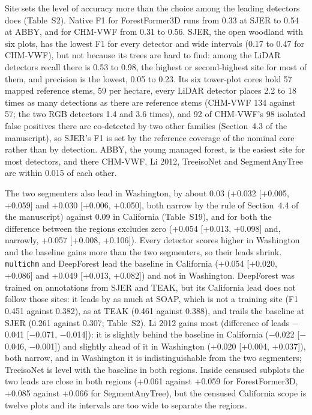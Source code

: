 \documentclass[10pt,a4paper]{article}
\begin{document}
Site sets the level of accuracy more than the choice among the leading detectors
does (Table~S2). Native F1 for ForestFormer3D runs from 0.33 at SJER to 0.54 at
ABBY, and for CHM-VWF from 0.31 to 0.56. SJER, the open woodland with six plots,
has the lowest F1 for every detector and wide intervals (0.17 to 0.47 for
CHM-VWF), but not because its trees are hard to find: among the LiDAR detectors
recall there is 0.53 to 0.98, the highest or second-highest site for most of
them, and precision is the lowest, 0.05 to 0.23. Its six tower-plot cores hold
57 mapped reference stems, 59 per hectare, every LiDAR detector places 2.2 to 18
times as many detections as there are reference stems (CHM-VWF 134 against 57;
the two RGB detectors 1.4 and 3.6 times), and 92 of CHM-VWF's 98 isolated false
positives there are co-detected by two other families (Section~4.3 of the
manuscript), so SJER's F1 is set by the reference coverage of the nominal core
rather than by detection. ABBY, the young managed forest, is the easiest site
for most detectors, and there CHM-VWF, Li 2012, TreeisoNet and SegmentAnyTree
are within 0.015 of each other.

The two segmenters also lead in Washington, by about 0.03 (+0.032 [+0.005,
+0.059] and +0.030 [+0.006, +0.050], both narrow by the rule of Section~4.4 of
the manuscript) against 0.09 in California (Table~S19), and for both the
difference between the regions excludes zero (+0.054 [+0.013, +0.098] and,
narrowly, +0.057 [+0.008, +0.106]). Every detector scores higher in Washington
and the baseline gains more than the two segmenters, so their leads shrink.
\texttt{multichm} and DeepForest lead the baseline in California (+0.054 [+0.020,
+0.086] and +0.049 [+0.013, +0.082]) and not in Washington. DeepForest was
trained on annotations from SJER and TEAK, but its California lead does not
follow those sites: it leads by as much at SOAP, which is not a training site
(F1 0.451 against 0.382), as at TEAK (0.461 against 0.388), and trails the
baseline at SJER (0.261 against 0.307; Table~S2). Li 2012 gains most (difference
of leads $-$0.041 [$-$0.071, $-$0.014]): it is slightly behind the baseline in
California ($-$0.022 [$-$0.046, $-$0.001]) and slightly ahead of it in Washington
(+0.020 [+0.004, +0.037]), both narrow, and in Washington it is
indistinguishable from the two segmenters; TreeisoNet is level with the baseline
in both regions. Inside censused subplots the two leads are close in both
regions (+0.061 against +0.059 for ForestFormer3D, +0.085 against +0.066 for
SegmentAnyTree), but the censused California scope is twelve plots and its
intervals are too wide to separate the regions.
\end{document}

